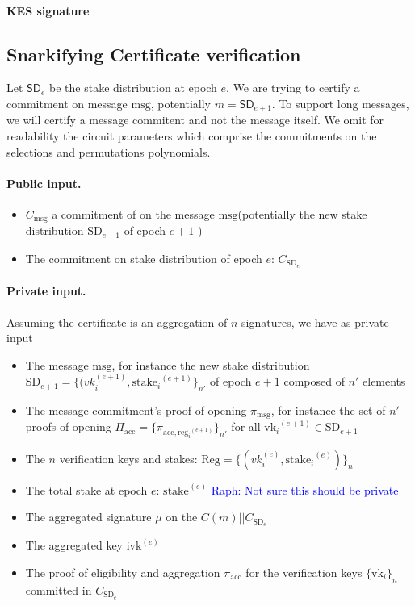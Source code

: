 \documentclass{article}
\newcommand{\vk}[1]{\ensuremath{\textrm{vk}_{#1}}\xspace}
\newcommand{\m}{\ensuremath{\textrm{msg}}\xspace}
\newcommand{\acc}{\ensuremath{\textrm{acc}}\xspace}
\newcommand{\reg}[1]{\ensuremath{\textrm{reg}_{#1}}\xspace}
\newcommand{\stake}[1]{\ensuremath{\textrm{stake}_{#1}}\xspace}
\newcommand{\ivk}{\ensuremath{\textrm{ivk}}\xspace}
\newcommand{\raph}[1]{\textcolor{blue}{Raph: #1}\xspace}
\begin{document}
\paragraph{KES signature}

%
%
\subsection{Snarkifying Certificate verification}
\label{subsec:SnarkCert}

Let $\textsf{SD}_e$ be the stake distribution at epoch $e$. We are trying to certify a commitment on message \m, potentially $m = \textsf{SD}_{e+1}$. To support long messages, we will certify a message commitent and not the message itself.
We omit for readability the circuit parameters which comprise the commitments on the selections and permutations polynomials.

\paragraph{Public input.}
\begin{itemize}
    \item $C_\m$ a commitment of on the message \m (potentially the new stake distribution $\text{SD}_{e+1}$ of epoch $e+1$ )
    \item The commitment on stake distribution of epoch $e$: $C_{\text{SD}_e}$
\end{itemize}

\paragraph{Private input.}
Assuming the certificate is an aggregation of $n$ signatures, we have as private input

\begin{itemize}
    \item The message \m, for instance the new stake distribution $\text{SD}_{e+1} = \{ (vk_i^{(e+1)}, \stake{i}^{(e+1)} \}_{n'} $ of epoch $e+1$ composed of $n'$ elements
    \item The message commitment's proof of opening $\pi_\m$, for instance the set of $n'$ proofs of opening $\Pi_\acc = \{ \pi_{\acc, \reg{i}^{(e+1)}} \}_{n'}$  for all $\vk{i}^{(e+1)} \in \text{SD}_{e+1}$
    \item The $n$ verification keys and stakes: $\text{Reg} = \{ (vk_i^{(e)}, \stake{i}^{(e)} ) \}_n$
    \item The total stake at epoch $e$: $\stake{}^{(e)}$ \raph{Not sure this should be private}
    \item The aggregated signature $\mu$ on the $C(m) || C_{\text{SD}_e}$
    \item The aggregated key $\ivk^{(e)}$
    \item The proof of eligibility and aggregation $\pi_{\acc}$ for the verification keys $\{\vk{i}\}_n$ committed in $C_{\text{SD}_e}$
\end{itemize}
\end{document}
